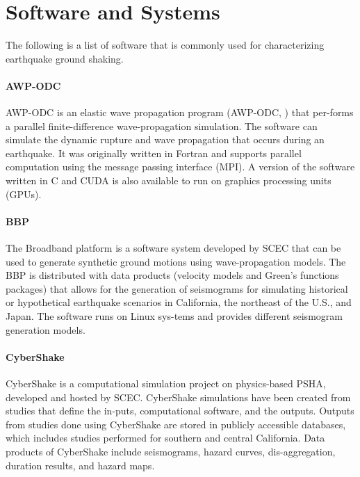 \section{Software and Systems}
\label{sec:eq_shake_tools}

The following is a list of software that is commonly used for characterizing earthquake ground shaking.

\paragraph{AWP-ODC} AWP-ODC is an elastic wave propagation program (AWP-ODC, \cite{cui2010scalable}) that per-forms a parallel finite-difference wave-propagation simulation. The software can simulate the dynamic rupture and wave propagation that occurs during an earthquake. It was originally written in Fortran and supports parallel computation using the message passing interface (MPI). A version of the software written in C and CUDA is also available to run on graphics processing units (GPUs).

\paragraph{BBP} The Broadband platform \citep{maechling2015scec} is a software system developed by SCEC that can be used to generate synthetic ground motions using wave-propagation models. The BBP is distributed with data products (velocity models and Green’s functions packages) that allows for the generation of seismograms for simulating historical or hypothetical earthquake scenarios in California, the northeast of the U.S., and Japan. The software runs on Linux sys-tems and provides different seismogram generation models.

\paragraph{CyberShake} CyberShake is a computational simulation project on physics-based PSHA, developed and hosted by SCEC. CyberShake simulations have been created from studies that define the in-puts, computational software, and the outputs. Outputs from studies done using CyberShake are stored in publicly accessible databases, which includes studies performed for southern and central California. Data products of CyberShake include seismograms, hazard curves, dis-aggregation, duration results, and hazard maps.

